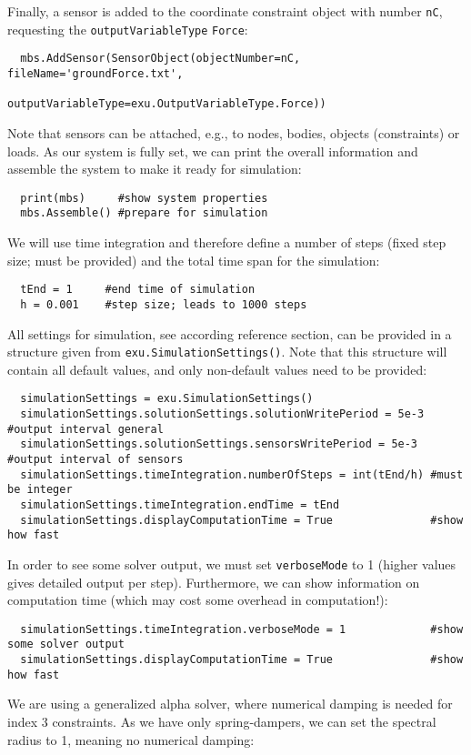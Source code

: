 Finally, a sensor is added to the coordinate constraint object with number \texttt{nC}, requesting the \texttt{outputVariableType} \texttt{Force}:
\pythonstyle\begin{lstlisting}
  mbs.AddSensor(SensorObject(objectNumber=nC, fileName='groundForce.txt', 
                             outputVariableType=exu.OutputVariableType.Force))
\end{lstlisting}
Note that sensors can be attached, e.g., to nodes, bodies, objects (constraints) or loads.
%
As our system is fully set, we can print the overall information and assemble the system to make it ready for simulation:
\pythonstyle\begin{lstlisting}
  print(mbs)     #show system properties
  mbs.Assemble() #prepare for simulation
\end{lstlisting}
%
We will use time integration and therefore define a number of steps (fixed step size; must be provided) and the total time span for the simulation:
\pythonstyle\begin{lstlisting}
  tEnd = 1     #end time of simulation
  h = 0.001    #step size; leads to 1000 steps
\end{lstlisting}
%
All settings for simulation, see according reference section, can be provided in a structure given from \texttt{exu.SimulationSettings()}. Note that this structure will contain all default values, and only non-default values need to be provided:
\pythonstyle\begin{lstlisting}
  simulationSettings = exu.SimulationSettings()
  simulationSettings.solutionSettings.solutionWritePeriod = 5e-3 #output interval general
  simulationSettings.solutionSettings.sensorsWritePeriod = 5e-3  #output interval of sensors
  simulationSettings.timeIntegration.numberOfSteps = int(tEnd/h) #must be integer
  simulationSettings.timeIntegration.endTime = tEnd
  simulationSettings.displayComputationTime = True               #show how fast
\end{lstlisting}
%
In order to see some solver output, we must set \texttt{verboseMode} to 1 (higher values gives detailed output per step).
Furthermore, we can show information on computation time (which may cost some overhead in computation!):
\pythonstyle\begin{lstlisting}
  simulationSettings.timeIntegration.verboseMode = 1             #show some solver output
  simulationSettings.displayComputationTime = True               #show how fast
\end{lstlisting}
We are using a generalized alpha solver, where numerical damping is needed for index 3 constraints. As we have only spring-dampers, we can set the spectral radius to 1, meaning no numerical damping:

